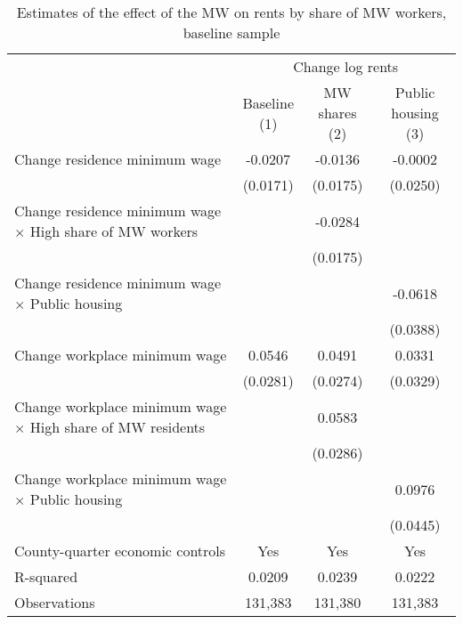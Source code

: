 \begin{table}[hbt!] \centering
    \caption{Estimates of the effect of the MW on rents by share of MW workers, baseline sample}
    \label{tab:heterogeneity}
    \begin{tabular}{@{}lccc@{}}
        \toprule
            & \multicolumn{3}{c}{Change log rents}                                                  \\ \cmidrule(l){2-4} 
            & \shortstack{Baseline \\(1)} 
            & \shortstack{MW shares \\(2)}                                             
            & \shortstack{Public housing \\(3)}                                                     \\ \midrule
        Change residence minimum wage                                     &  -0.0207   &  -0.0136  &  -0.0002   \\
                                                                          & (0.0171)  & (0.0175) & (0.0250)  \\
        Change residence minimum wage $\times$ High share of MW workers   &        &  -0.0284  &        \\
                                                                          &        & (0.0175) &        \\
        Change residence minimum wage $\times$ Public housing             &        &       &  -0.0618   \\
                                                                          &        &       & (0.0388)  \\
        Change workplace minimum wage                                     &  0.0546   &  0.0491  &  0.0331   \\
                                                                          & (0.0281)  & (0.0274) & (0.0329)  \\
        Change workplace minimum wage $\times$ High share of MW residents &        &  0.0583  &        \\
                                                                          &        & (0.0286) &        \\
        Change workplace minimum wage $\times$ Public housing             &        &       &  0.0976   \\
                                                                          &        &       & (0.0445)  \\
        County-quarter economic controls                                  &  Yes   &  Yes  &   Yes  \\
        R-squared                                                         &  0.0209   &  0.0239  &   0.0222  \\
        Observations                                                      &  131,383  &  131,380 &   131,383 \\ \bottomrule
    \end{tabular}


\end{table}

